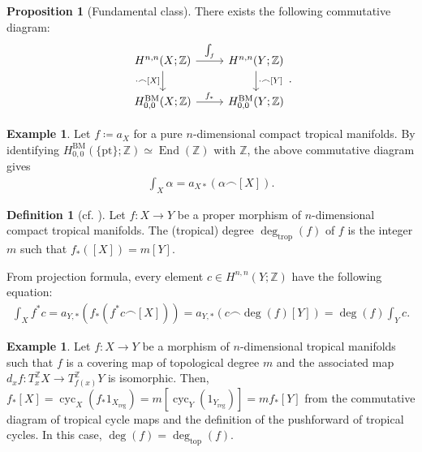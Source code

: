 \documentclass[a4paper,dvipdfmx,reqno,12pt]{amsart}
\theoremstyle{definition}
\newtheorem{definition}[theorem]{Definition}
\newtheorem{example}[theorem]{Example}
\newtheorem{proposition}[theorem]{Proposition}
\newcommand{\deq}{\coloneqq}
\newcommand{\opn}[1]{\operatorname{#1}}
\numberwithin{equation}{section}
\begin{document}
\begin{proposition}[{Fundamental class}]
There exists the following commutative diagram:
\begin{equation}
\begin{tikzcd}
{{H^{n,n}(X;\mathbb{Z})}} \arrow[d, "{\cdot \frown [X]}"'] \arrow[r, "\int_f"] & {{H^{n,n}(Y;\mathbb{Z})}} \arrow[d, "{\cdot \frown [Y]}"] \\
{H_{0,0}^{\mathrm{BM}}(X;\mathbb{Z})} \arrow[r, "f_*"]                         & {H_{0,0}^{\mathrm{BM}}(Y;\mathbb{Z})}                    
\end{tikzcd}.
\end{equation}
\end{proposition}

\begin{example}
Let $f\deq a_X$ for a pure $n$-dimensional compact 
tropical manifolds. 
By identifying $H_{0,0}^{\mathrm{BM}}(\{\mathrm{pt}\};
\mathbb{Z})\simeq \opn{End}(\mathbb{Z})$ with 
$\mathbb{Z}$, the above commutative diagram gives
\begin{align}
\int_{X}\alpha =a_{X*}(\alpha \frown [X]).
\end{align}

\end{example}


\begin{definition}[{cf. \cite[Definition 2.11]{MR3668972}}]
Let $f\colon X \to Y$ be a proper morphism of 
$n$-dimensional compact tropical manifolds.
The (tropical) degree $\opn{deg}_{\opn{trop}}(f)$ of $f$ is the integer $m$
such that $f_*([X])=m[Y]$.
\end{definition}



From projection formula, every element 
$c\in H^{n,n}(Y;\mathbb{Z})$ have the following equation:
\begin{align}
\int_{X}f^{*}c
=a_{Y,*}(f_*(f^{*}c\frown [X]))
=a_{Y,*}(c\frown \opn{deg}(f)[Y])
=\opn{deg}(f)\int_Y c.
\end{align}

\begin{example}
Let $f\colon X\to Y$ be a morphism of 
$n$-dimensional tropical manifolds such that $f$ is a 
covering map of topological degree $m$ and the associated map $d_xf\colon 
T_{x}^{\mathbb{Z}} X\to T_{f(x)}^{\mathbb{Z}}Y$ is 
isomorphic.
Then, $f_*[X]=\opn{cyc}_X(f_*1_{X_{\mathrm{reg}}})
=m[\opn{cyc}_Y(1_{Y_{\mathrm{reg}}})]=m
f_*[Y]$ from the commutative diagram of
tropical cycle maps and the definition of the pushforward
of tropical cycles.
In this case, $\opn{deg}(f)=\opn{deg}_{\mathrm{top}}(f)$.
\end{example}
\end{document}

